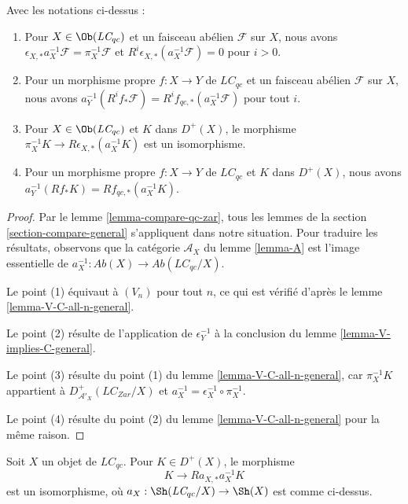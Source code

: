 \begin{lemma}
\label{lemma-V-C-all-n}
Avec les notations ci-dessus :
\begin{enumerate}
\item Pour $X \in \Ob(\textit{LC}_{qc})$ et un faisceau abélien
$\mathcal{F}$ sur $X$, nous avons
$\epsilon_{X, *}a_X^{-1}\mathcal{F} = \pi_X^{-1}\mathcal{F}$ et
$R^i\epsilon_{X, *}(a_X^{-1}\mathcal{F}) = 0$ pour $i > 0$.
\item Pour un morphisme propre $f : X \to Y$ de $\textit{LC}_{qc}$ et un
faisceau abélien $\mathcal{F}$ sur $X$, nous avons
$a_Y^{-1}(R^if_*\mathcal{F}) = R^if_{qc, *}(a_X^{-1}\mathcal{F})$
pour tout $i$.
\item Pour $X \in \Ob(\textit{LC}_{qc})$ et $K$ dans $D^+(X)$, le
morphisme $\pi_X^{-1}K \to R\epsilon_{X, *}(a_X^{-1}K)$ est un isomorphisme.
\item Pour un morphisme propre $f : X \to Y$ de $\textit{LC}_{qc}$ et $K$
dans $D^+(X)$, nous avons
$a_Y^{-1}(Rf_*K) = Rf_{qc, *}(a_X^{-1}K)$.
\end{enumerate}
\end{lemma}

\begin{proof}
Par le lemme \ref{lemma-compare-qc-zar}, tous les lemmes de la
section \ref{section-compare-general} s'appliquent dans notre situation.
Pour traduire les résultats, observons que la catégorie $\mathcal{A}_X$ du
lemme \ref{lemma-A} est l'image essentielle de
$a_X^{-1} : \textit{Ab}(X) \to \textit{Ab}(\textit{LC}_{qc}/X)$.

\medskip\noindent
Le point (1) équivaut à $(V_n)$ pour tout $n$, ce qui est vérifié d'après le
lemme \ref{lemma-V-C-all-n-general}.

\medskip\noindent
Le point (2) résulte de l'application de $\epsilon_Y^{-1}$ à la conclusion
du lemme \ref{lemma-V-implies-C-general}.

\medskip\noindent
Le point (3) résulte du point (1) du
lemme \ref{lemma-V-C-all-n-general}, car $\pi_X^{-1}K$ appartient à
$D^+_{\mathcal{A}'_X}(\textit{LC}_{Zar}/X)$ et
$a_X^{-1} = \epsilon_X^{-1} \circ \pi_X^{-1}$.

\medskip\noindent
Le point (4) résulte du point (2) du
lemme \ref{lemma-V-C-all-n-general} pour la même raison.
\end{proof}

\begin{lemma}
\label{lemma-cohomological-descent-LC}
Soit $X$ un objet de $\textit{LC}_{qc}$. Pour $K \in D^+(X)$, le morphisme
$$
K \longrightarrow Ra_{X, *}a_X^{-1}K
$$
est un isomorphisme, où
$a_X : \Sh(\textit{LC}_{qc}/X) \to \Sh(X)$ est comme ci-dessus.
\end{lemma}

